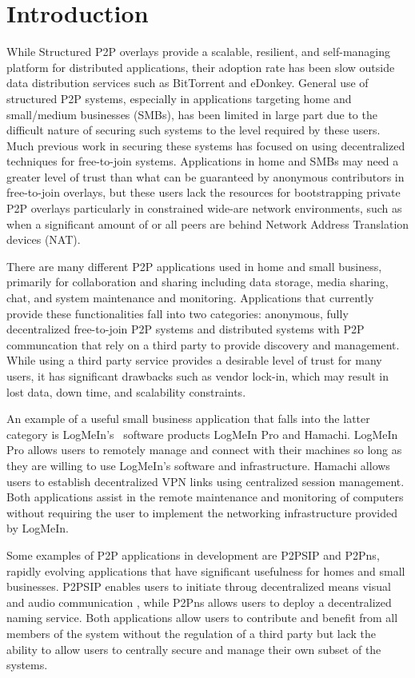 \documentclass[conference]{IEEEtran}
\begin{document}
\section{Introduction}
While Structured P2P overlays provide a scalable, resilient, and self-managing
platform for distributed applications, their adoption rate has been slow outside
data distribution services such as BitTorrent
and eDonkey.  General use of structured P2P systems, especially in applications
targeting home and small/medium businesses (SMBs), has been limited in large
part due to the difficult nature of securing such systems to the level required
by these users.  Much previous work in securing these systems has focused on
using decentralized techniques for free-to-join systems.  Applications in home
and SMBs may need a greater level of trust than what can be guaranteed by
anonymous contributors in free-to-join overlays, but these users lack the
resources for bootstrapping private P2P overlays particularly in constrained
wide-are network environments, such as when a significant amount of or all
peers are behind Network Address Translation devices (NAT).

There are many different P2P applications used in home and small business,
primarily for collaboration and sharing including data storage, media
sharing, chat, and system maintenance and monitoring.
Applications that currently provide these functionalities fall into two
categories:  anonymous, fully decentralized free-to-join P2P systems and
distributed systems with P2P communcation that rely on a third party to provide
discovery and management.  While using a third party service provides a desirable
level of trust for many users, it has significant drawbacks such as vendor lock-in,
which may result in lost data, down time, and scalability constraints.

An example of a useful small business application that falls into the latter
category is LogMeIn's~\cite{logmein} software products LogMeIn Pro and Hamachi.
LogMeIn Pro allows users to remotely manage and connect with their machines so
long as they are willing to use LogMeIn's software and infrastructure.  Hamachi
allows users to establish decentralized VPN links using centralized session
management.  Both applications assist in the remote maintenance and monitoring
of computers without requiring the user to implement the networking
infrastructure provided by LogMeIn.

Some examples of P2P applications in development are P2PSIP and P2Pns, rapidly
evolving applications that have significant usefulness for homes and small
businesses.  P2PSIP enables users to initiate throug decentralized means visual
and audio communication , while P2Pns allows users to deploy a decentralized
naming service.  Both applications allow users to contribute and benefit from
all members of the system without the regulation of a third party but lack the
ability to allow users to centrally secure and manage their own subset of the
systems.
\end{document}
